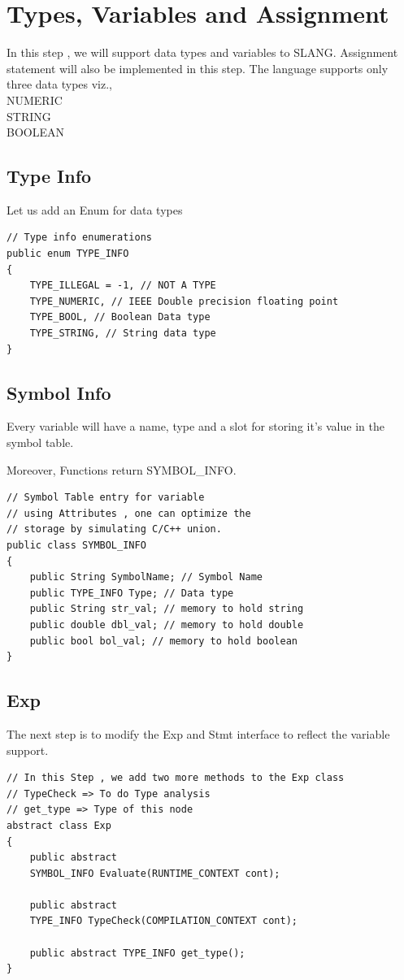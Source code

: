 \chapter{Types, Variables and Assignment}
In this step , we will support data types and variables to SLANG. Assignment statement will also be implemented in this step.
The language supports only three data types viz.,\\
NUMERIC\\
STRING\\
BOOLEAN\\
\section{Type Info}
Let us add an Enum for data types
\lstset{style=csharp}
\begin{lstlisting}
// Type info enumerations
public enum TYPE_INFO
{
	TYPE_ILLEGAL = -1, // NOT A TYPE
	TYPE_NUMERIC, // IEEE Double precision floating point
	TYPE_BOOL, // Boolean Data type
	TYPE_STRING, // String data type
}
\end{lstlisting}

\section{Symbol Info}
Every variable will have a name, type and a slot for storing it's value in the symbol table.

Moreover, Functions return SYMBOL\_INFO.
\lstset{style=csharp}
\begin{lstlisting}
// Symbol Table entry for variable
// using Attributes , one can optimize the
// storage by simulating C/C++ union.
public class SYMBOL_INFO
{
	public String SymbolName; // Symbol Name
	public TYPE_INFO Type; // Data type
	public String str_val; // memory to hold string
	public double dbl_val; // memory to hold double
	public bool bol_val; // memory to hold boolean
}
\end{lstlisting}

\section{Exp}
The next step is to modify the Exp and Stmt interface to reflect the variable support.
\lstset{style=csharp}
\begin{lstlisting}
// In this Step , we add two more methods to the Exp class
// TypeCheck => To do Type analysis
// get_type => Type of this node
abstract class Exp
{
	public abstract 
	SYMBOL_INFO Evaluate(RUNTIME_CONTEXT cont);
	
	public abstract 
	TYPE_INFO TypeCheck(COMPILATION_CONTEXT cont);
	
	public abstract TYPE_INFO get_type();
}
\end{lstlisting}

